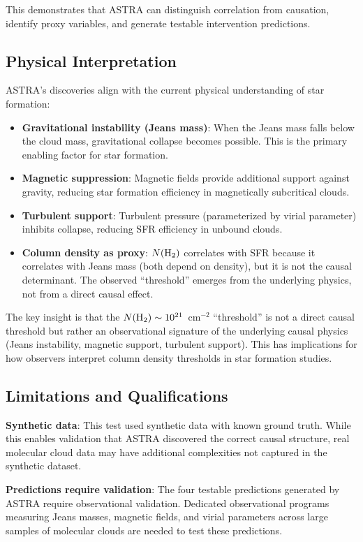 \documentclass[usenatbib]{rasti}
\begin{document}
This demonstrates that ASTRA can distinguish correlation from causation, identify proxy variables, and generate testable intervention predictions.

\subsection{Physical Interpretation}

ASTRA's discoveries align with the current physical understanding of star formation:

\begin{itemize}
\item \textbf{Gravitational instability (Jeans mass)}: When the Jeans mass falls below the cloud mass, gravitational collapse becomes possible. This is the primary enabling factor for star formation.
\item \textbf{Magnetic suppression}: Magnetic fields provide additional support against gravity, reducing star formation efficiency in magnetically subcritical clouds.
\item \textbf{Turbulent support}: Turbulent pressure (parameterized by virial parameter) inhibits collapse, reducing SFR efficiency in unbound clouds.
\item \textbf{Column density as proxy}: $N({\rm H_2})$ correlates with SFR because it correlates with Jeans mass (both depend on density), but it is not the causal determinant. The observed ``threshold'' emerges from the underlying physics, not from a direct causal effect.
\end{itemize}

The key insight is that the $N({\rm H_2}) \sim 10^{21}$~cm$^{-2}$ ``threshold'' is not a direct causal threshold but rather an observational signature of the underlying causal physics (Jeans instability, magnetic support, turbulent support). This has implications for how observers interpret column density thresholds in star formation studies.

\subsection{Limitations and Qualifications}

\textbf{Synthetic data}: This test used synthetic data with known ground truth. While this enables validation that ASTRA discovered the correct causal structure, real molecular cloud data may have additional complexities not captured in the synthetic dataset.

\textbf{Predictions require validation}: The four testable predictions generated by ASTRA require observational validation. Dedicated observational programs measuring Jeans masses, magnetic fields, and virial parameters across large samples of molecular clouds are needed to test these predictions.
\end{document}
